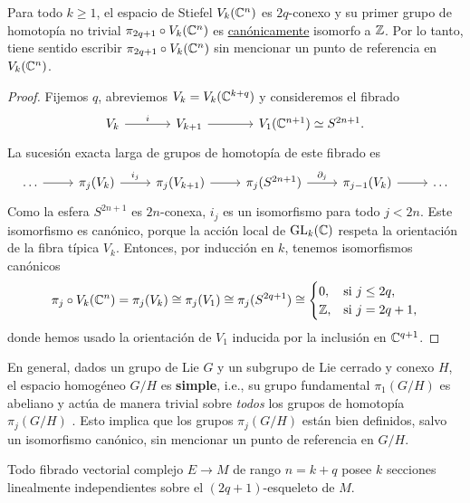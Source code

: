 \begin{theorem}
Para todo $k \ge 1$, el espacio de Stiefel $V_k(\mathbb C^n)$ es $2q$-conexo y su primer grupo de homotopía no trivial $\pi_{2q+1} \circ V_k(\mathbb C^n)$ es \underline{canónicamente} isomorfo a $\mathbb Z$. Por lo tanto, tiene sentido escribir $\pi_{2q+1} \circ V_k(\mathbb C^n)$ sin mencionar un punto de referencia en $V_k(\mathbb C^n)$.
\end{theorem}

\begin{proof}
Fijemos $q$, abreviemos $V_k = V_k(\mathbb C^{k+q})$ y consideremos el fibrado
$$
\begin{tikzcd}[row sep = large, column sep = large]
    V_k \arrow[r, "i"] & V_{k+1} \arrow[r] & V_1(\C^{n+1}) \simeq S^{2n+1}.
\end{tikzcd}
$$
La sucesión exacta larga de grupos de homotopía de este fibrado es
$$
\begin{tikzcd}
    \dots \arrow[r]
        & \pi_j(V_k) \arrow[r, "i_j"]
        & \pi_j(V_{k+1}) \arrow[r]
        & \pi_j(S^{2n+1}) \arrow[r, "\partial_j"]
        & \pi_{j-1}(V_k) \arrow[r]
        & \dots
\end{tikzcd}
$$
Como la esfera $S^{2n+1}$ es $2n$-conexa, $i_j$ es un isomorfismo para todo $j < 2n$. Este isomorfismo es canónico, porque la acción local de $\operatorname{GL}_k(\mathbb C)$ respeta la orientación de la fibra típica $V_k$. Entonces, por inducción en $k$, tenemos isomorfismos canónicos
$$
\pi_j \circ V_k(\mathbb C^n) = \pi_j(V_k) \cong \pi_j(V_1) \cong \pi_j(S^{2q+1}) \cong
    \begin{cases}
        0,  & \text{si } j \le 2q, \\
        \mathbb Z, & \text{si } j  =  2q + 1,
    \end{cases}
$$
donde hemos usado la orientación de $V_1$ inducida por la inclusión en $\mathbb C^{q+1}$.
\end{proof}

\begin{remark}
En general, dados un grupo de Lie $G$ y un subgrupo de Lie cerrado y conexo $H$, el espacio homogéneo $G/H$ es \textbf{simple}, i.e., su grupo fundamental $\pi_1(G/H)$ es abeliano y actúa de manera trivial sobre \textit{todos} los grupos de homotopía $\pi_j(G/H)$ \cite[p. 89]{steenrod}. Esto implica que los grupos $\pi_j(G/H)$ están bien definidos, salvo un isomorfismo canónico, sin mencionar un punto de referencia en $G/H$.
\end{remark}

\begin{corollary}
Todo fibrado vectorial complejo $E \to M$ de rango $n = k+q$ posee $k$ secciones linealmente independientes sobre el $(2q+1)$-esqueleto de $M$.
\end{corollary}

